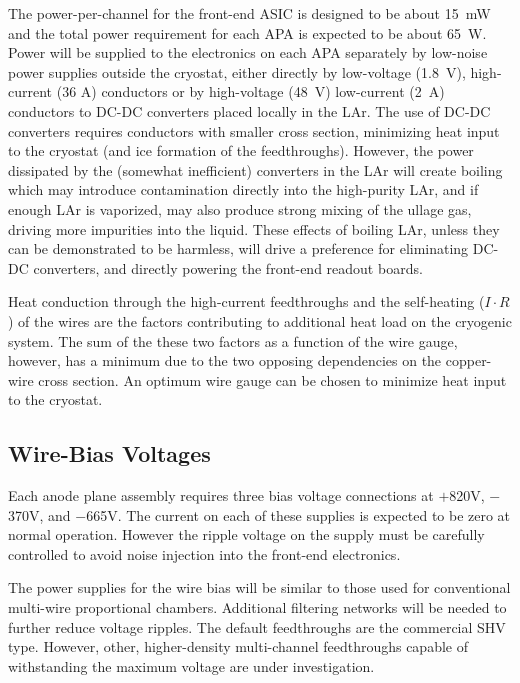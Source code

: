 The power-per-channel for the front-end ASIC is designed to be about 15~mW and
the total power requirement for each APA is expected to be about 65~W.
Power will be supplied to the electronics on each APA separately by low-noise
power supplies outside the cryostat, either directly by
low-voltage (1.8~V), high-current (36 A) conductors or by high-voltage (48~V)
low-current (2~A) conductors to DC-DC converters placed locally in the LAr.
The use of DC-DC converters requires conductors with smaller cross section,
minimizing heat input to the cryostat (and ice formation of the feedthroughs).
However, the power dissipated by the (somewhat inefficient) converters in
the LAr will create boiling which may introduce contamination directly into the 
high-purity LAr, and if enough LAr is vaporized, may also produce strong mixing of the
ullage gas, driving more impurities into the liquid.
These effects of boiling LAr, unless they can be demonstrated to be harmless,
will drive a preference for eliminating DC-DC converters, and directly powering the front-end readout boards.

Heat conduction through the high-current feedthroughs and the self-heating ($I\cdot R$) of the wires are the factors
contributing to additional heat load on the cryogenic system.
The sum of the these two factors as a function of the wire gauge, however, has a minimum 
due to the two opposing dependencies on the copper-wire cross section.
An optimum wire gauge can be chosen to minimize heat input to the cryostat.

%
\subsection{Wire-Bias Voltages}
\label{subsec:ce-feedthrough-wirebias}

Each anode plane assembly requires three bias voltage connections 
at $+$820V, $-$370V, and $-$665V.
The current on each of these supplies is expected to be zero at normal operation.
However the ripple voltage on the supply must be carefully controlled 
to avoid noise injection into the front-end electronics.  

The power supplies for the wire bias will be similar to 
those used for conventional multi-wire proportional chambers. 
Additional filtering networks will 
be needed to further reduce voltage ripples.  
The default feedthroughs are the commercial SHV type.  
However,  other, higher-density multi-channel 
feedthroughs capable of withstanding the maximum voltage are under investigation.  

